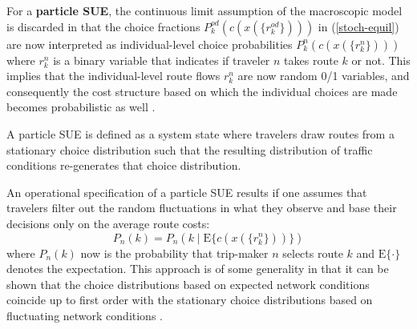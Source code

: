 For a \textbf{particle SUE}, the continuous limit assumption of the
macroscopic model is discarded in that the choice fractions 
$P^{od}_k(c(x(\{r^{od}_k\})))$ in (\ref{stoch-equil})
are now interpreted as individual-level choice probabilities
%
$P^{n}_k(c(x(\{r_k^{n}\})))$ where $r_k^{n}$ is a binary variable
that indicates if traveler $n$ takes route $k$ or not.
%
This implies that the individual-level route flows $r^{n}_k$ 
are now random 0/1 variables, and consequently
the cost structure based on which the individual choices are made
becomes probabilistic as well
\citep[][]{balijepalli-2007, cascetta-1991, cascetta-1989}.

A particle SUE is defined as a system state where travelers draw routes from a
stationary choice distribution such that the resulting distribution of
traffic conditions re-generates that choice distribution.

An operational specification of a particle SUE results if one
assumes that travelers filter out the random fluctuations in what
they observe and base their decisions only on the average route
costs:
\begin{equation}
\label{eq:sue-with-expectation}
P_n(k) = P_n\left( k \mid \text{E} \{ c( x( \{r^{n}_k\}) ) \} \right)
\end{equation}
where $P_n(k)$ now is the probability that trip-maker $n$
selects route $k$ and $\text{E}\{\cdot\}$ denotes the expectation.
%
This approach is of some generality in that it can be shown that the
choice distributions based on expected network conditions coincide up
to first order with the stationary choice distributions based on
fluctuating network conditions \citep[][]{floetteroed-2010e}.

%
%
%
%

